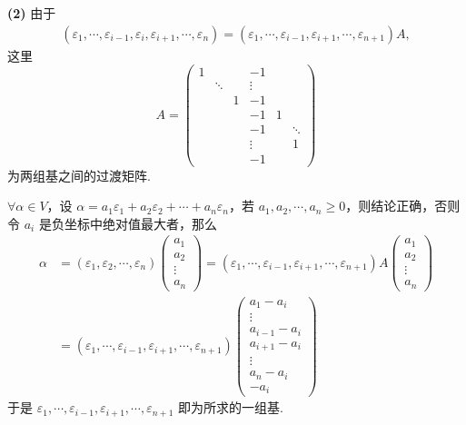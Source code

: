 \begin{solution}
\textbf{(2)} 由于
\begin{align*}
(\varepsilon_1,\cdots,\varepsilon_{i-1},\varepsilon_i,\varepsilon_{i+1},\cdots,\varepsilon_n)=(\varepsilon_1,\cdots,\varepsilon_{i-1},\varepsilon_{i+1},\cdots,\varepsilon_{n+1})A,
\end{align*}
这里
\[
  A=\begin{pmatrix}
    1 &        &        & -1     &        &        \\
      & \ddots &        & \vdots &        &        \\
      &        & 1      & -1     &        &        \\
      &        &        & -1     & 1      &        \\
      &        &        & -1     &        & \ddots \\
      &        &        & \vdots &        & 1\\
      &        &        & -1     &        &
  \end{pmatrix}
\]
为两组基之间的过渡矩阵.

$\forall\alpha\in V$，设 $\alpha=a_1\varepsilon_1+a_2\varepsilon_2+\cdots+a_n\varepsilon_n$，若 $a_1,a_2,\cdots,a_n\ge0$，则结论正确，否则令 $a_i$ 是负坐标中绝对值最大者，那么
\begin{align*}
\alpha&=(\varepsilon_1,\varepsilon_2,\cdots,\varepsilon_n)
\begin{pmatrix}
  a_1\\a_2\\\vdots\\a_n
\end{pmatrix}
=(\varepsilon_1,\cdots,\varepsilon_{i-1},\varepsilon_{i+1},\cdots,\varepsilon_{n+1})A
\begin{pmatrix}
  a_1\\a_2\\\vdots\\a_n
\end{pmatrix}\\
&=(\varepsilon_1,\cdots,\varepsilon_{i-1},\varepsilon_{i+1},\cdots,\varepsilon_{n+1})
\begin{pmatrix}
  a_1-a_i\\
  \vdots\\
  a_{i-1}-a_i\\
  a_{i+1}-a_i\\
  \vdots\\
  a_n-a_i\\
  -a_i
\end{pmatrix}
\end{align*}
于是 $\varepsilon_1,\cdots,\varepsilon_{i-1},\varepsilon_{i+1},\cdots,\varepsilon_{n+1}$ 即为所求的一组基.


\end{solution}

